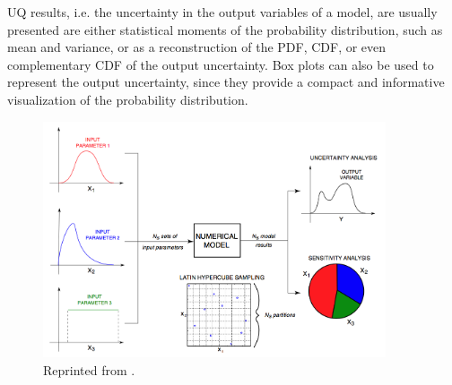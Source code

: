 \documentclass[12pt]{article}
\begin{document}
  UQ results, i.e. the uncertainty in the output variables of a model, are usually presented are either statistical moments of the probability distribution, such as mean and variance, or as a reconstruction of the PDF, CDF, or even complementary CDF of the output uncertainty. Box plots can also be used to represent the output uncertainty, since they provide a compact and informative visualization of the probability distribution.

  
  
    \begin{figure}[h]
  	\centering
  	\includegraphics[width=0.9\textwidth]{images/UQ_SA_framework.png}
  	\caption{Reprinted from \cite{DEMICHIELIVITTURI201677}.}
  	\label{fig:UQ_SA_framework}
  \end{figure}
  
\end{document}
